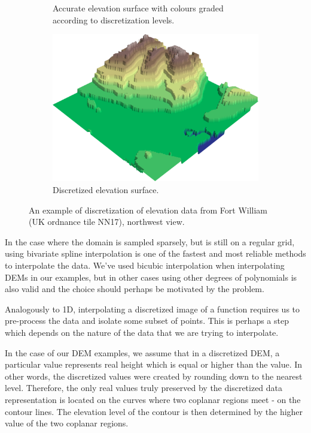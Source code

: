 \documentclass[a4paper,10pt]{report}
\begin{document}
\begin{figure}[H]
\begin{subfigure}{.3\textwidth}
    \caption{Accurate elevation surface with colours graded according to discretization levels.}
    \end{subfigure}
    \hfill
    \begin{subfigure}{.3\textwidth}
        \includegraphics[width=1\textwidth]{../images/discretize/Discretized.png}
    \caption{Discretized elevation surface.}
    \end{subfigure}
    \caption{An example of discretization of elevation data from Fort William (UK ordnance tile NN17), northwest view.}
    \label{fig:3D_discrete_example}
\end{figure}

In the case where the domain is sampled sparsely, but is still on a regular grid, using bivariate spline interpolation is one of the fastest and most reliable methods to interpolate the data. We've used bicubic interpolation when interpolating DEMs in our examples, but in other cases using other degrees of polynomials is also valid and the choice should perhaps be motivated by the problem.

Analogously to 1D, interpolating a discretized image of a function requires us to pre-process the data and isolate some subset of points. This is perhaps a step which depends on the nature of the data that we are trying to interpolate.

In the case of our  DEM examples, we assume that in a discretized DEM, a particular value represents real height which is equal or higher than the value. In other words, the discretized values were created by rounding down to the nearest level. Therefore, the only real values truly preserved by the discretized data representation is located on the curves where two coplanar regions meet - on the contour lines. The elevation level of the contour is then determined by the higher value of the two coplanar regions.
\end{document}
